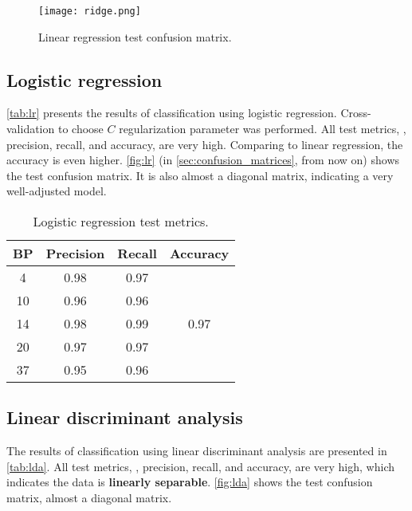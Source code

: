         \begin{figure}[H]
                \texttt{[image: ridge.png]}
                \caption{Linear regression test confusion matrix.}
                \label{fig:rigde}
        \end{figure}

    \subsection{Logistic regression}

        \autoref{tab:lr} presents the results of classification using logistic regression. Cross-validation to choose $C$ regularization parameter was performed. All test metrics, \ie, precision, recall, and accuracy, are very high. Comparing to linear regression, the accuracy is even higher. \autoref{fig:lr} (in \autoref{sec:confusion_matrices}, from now on) shows the test confusion matrix. It is also almost a diagonal matrix, indicating a very well-adjusted model.

        \begin{table}[H]
                \centering
                \caption{Logistic regression test metrics.}
                \label{tab:lr}
                \begin{tabular}{c|cc|c}
                BP & Precision & Recall & Accuracy              \\ \hline
                4  & 0.98      & 0.97   & \multirow{5}{*}{0.97} \\
                10 & 0.96      & 0.96   &                       \\
                14 & 0.98      & 0.99   &                       \\
                20 & 0.97      & 0.97   &                       \\
                37 & 0.95      & 0.96   &                      
                \end{tabular}
        \end{table}

    \subsection{Linear discriminant analysis}

        The results of classification using linear discriminant analysis are presented in \autoref{tab:lda}. All test metrics, \ie, precision, recall, and accuracy, are very high, which indicates the data is \textbf{linearly separable}. \autoref{fig:lda} shows the test confusion matrix, almost a diagonal matrix.

